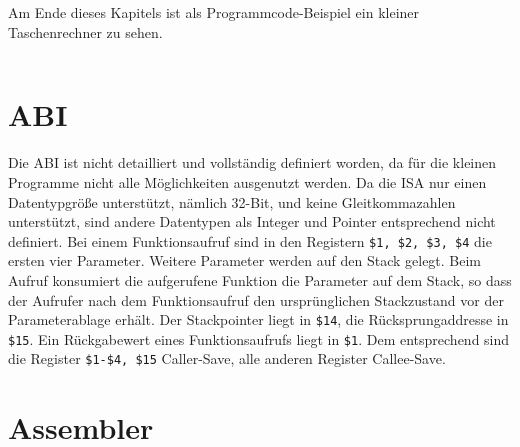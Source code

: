 
Am Ende dieses Kapitels ist als Programmcode-Beispiel ein kleiner Taschenrechner zu sehen.

\newpage
\begin{center}
\begin{multicols}{3}
\inputminted{nasm}{calc.s}
\end{multicols}
\end{center}

\newpage
\section{ABI}
Die ABI ist nicht detailliert und vollständig definiert worden, da für die kleinen Programme nicht alle Möglichkeiten ausgenutzt werden.
Da die ISA nur einen Datentypgröße unterstützt, nämlich 32-Bit, und keine Gleitkommazahlen unterstützt, sind andere Datentypen als Integer und Pointer entsprechend nicht definiert.
Bei einem Funktionsaufruf sind in den Registern \texttt{\$1, \$2, \$3, \$4} die ersten vier Parameter.
Weitere Parameter werden auf den Stack gelegt.
Beim Aufruf konsumiert die aufgerufene Funktion die Parameter auf dem Stack,
so dass der Aufrufer nach dem Funktionsaufruf den ursprünglichen Stackzustand vor der Parameterablage erhält. 
Der Stackpointer liegt in \texttt{\$14}, die Rücksprungaddresse in \texttt{\$15}.
Ein Rückgabewert eines Funktionsaufrufs liegt in \texttt{\$1}.
Dem entsprechend sind die Register \texttt{\$1-\$4, \$15} Caller-Save, alle anderen Register Callee-Save.

\section{Assembler} %

\begin{center}
\inputminted{py}{../assembler/operations/memOperation.py}
\end{center}

\begin{center}
\inputminted[firstline=59,lastline=75]{py}{../assembler/operations/pseudoOperation.py}
\end{center}

